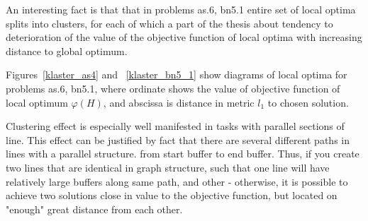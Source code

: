 \documentclass{ifacconf}
\begin{document}
An interesting fact is that
that in problems as.6, bn5.1 entire set of local optima splits
into clusters, for each of which a part of the thesis about tendency to
deterioration of the value of the objective function of local optima
with increasing distance to global optimum.

Figures~\ref{klaster_as4} and ~\ref{klaster_bn5_1} show diagrams of local optima for problems
as.6, bn5.1, where ordinate shows the value of objective function of local optimum $\varphi(H)$, and abscissa is
distance in metric $l_1$ to chosen solution.

Clustering effect is especially well manifested in tasks with parallel sections of line.
This effect can be justified by fact that there are several different paths in lines with a parallel structure.
from start buffer to end buffer. Thus, if you create two lines that are identical in graph structure,
such that one line will have relatively large buffers along same path, and other -
otherwise, it is possible to achieve two solutions close in value to the objective function, but located on "enough"
great distance from each other.
\end{document}
